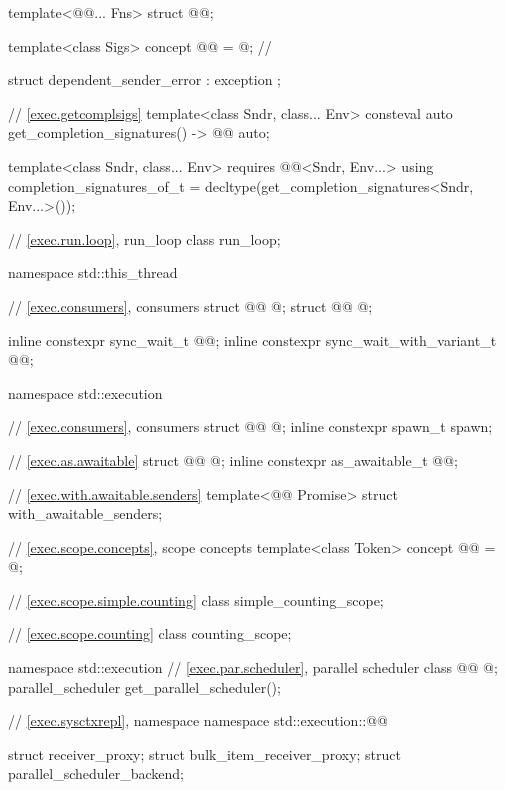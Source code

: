 \begin{codeblock}
{  template<@@... Fns>
    struct @@;

  template<class Sigs>
    concept @@ = @\seebelownc@;            // \expos

  struct dependent_sender_error : exception {};

  // \ref{exec.getcomplsigs}
  template<class Sndr, class... Env>
    consteval auto get_completion_signatures() -> @@ auto;

  template<class Sndr, class... Env>
      requires @@<Sndr, Env...>
    using completion_signatures_of_t = decltype(get_completion_signatures<Sndr, Env...>());

  // \ref{exec.run.loop}, run_loop
  class run_loop;
}

namespace std::this_thread {
  // \ref{exec.consumers}, consumers
  struct @@ { @\unspec@ };
  struct @@ { @\unspec@ };

  inline constexpr sync_wait_t @@{};
  inline constexpr sync_wait_with_variant_t @@{};
}

namespace std::execution {
  // \ref{exec.consumers}, consumers
  struct @@ { @\unspec@ };
  inline constexpr spawn_t spawn{};

  // \ref{exec.as.awaitable}
  struct @@ { @\unspec@ };
  inline constexpr as_awaitable_t @@{};

  // \ref{exec.with.awaitable.senders}
  template<@@ Promise>
    struct with_awaitable_senders;

  // \ref{exec.scope.concepts}, scope concepts
  template<class Token>
    concept @@ = @\seebelow@;

  // \ref{exec.scope.simple.counting}
  class simple_counting_scope;

  // \ref{exec.scope.counting}
  class counting_scope;
}

namespace std::execution {
  // \ref{exec.par.scheduler}, parallel scheduler
  class @@ { @\unspec@ };
  parallel_scheduler get_parallel_scheduler();
}

// \ref{exec.sysctxrepl}, namespace 
namespace std::execution::@@ {
  struct receiver_proxy;
  struct bulk_item_receiver_proxy;
  struct parallel_scheduler_backend;

}
\end{codeblock}
